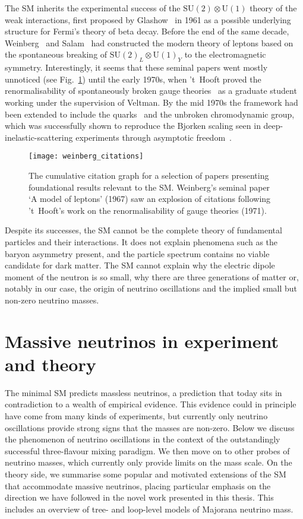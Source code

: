 The SM inherits the experimental success of the
$\mathrm{SU}(2) \otimes \mathrm{U}(1)$ theory of the weak interactions, first
proposed by Glashow~\cite{Glashow:1961tr} in 1961 as a possible underlying
structure for Fermi's theory of beta decay. Before the end of the same decade,
Weinberg~\cite{Weinberg:1967tq} and Salam~\cite{Salam:1968rm} had constructed
the modern theory of leptons based on the spontaneous breaking of
$\mathrm{SU}(2)_{L} \otimes \mathrm{U}(1)_{Y}$ to the electromagnetic symmetry.
Interestingly, it seems that these seminal papers went mostly unnoticed (see
Fig.~\ref{fig:weinberg-citations}) until the early 1970s, when 't~Hooft proved
the renormalisability of spontaneously broken gauge
theories~\cite{tHooft:1971akt} as a graduate student working under the
supervision of Veltman. By the mid 1970s the framework had been extended to
include the quarks~\cite{Glashow:1970gm} and the unbroken chromodynamic group,
which was successfully shown to reproduce the Bjorken scaling seen in
deep-inelastic-scattering experiments through asymptotic
freedom~\cite{Gross:1973id}.
\begin{figure}[t]
  \centering
  \texttt{[image: weinberg\_citations]}
  \caption{The cumulative citation graph for a selection of papers presenting
    foundational results relevant to the SM. Weinberg's seminal paper `A model
    of leptons' (1967) saw an explosion of citations following 't~Hooft's work
    on the renormalisability of gauge theories (1971).}
  \label{fig:weinberg-citations}
\end{figure}

Despite its successes, the SM cannot be the complete theory of fundamental
particles and their interactions. It does not explain phenomena such as the
baryon asymmetry present, and the particle spectrum contains no viable candidate
for dark matter. The SM cannot explain why the electric dipole moment of the
neutron is so small, why there are three generations of matter or, notably in
our case, the origin of neutrino oscillations and the implied small but non-zero
neutrino masses.

\section{Massive neutrinos in experiment and theory}

The minimal SM predicts massless neutrinos, a prediction that today sits in
contradiction to a wealth of empirical evidence. This evidence could in
principle have come from many kinds of experiments, but currently only neutrino
oscillations provide strong signs that the masses are non-zero. Below we discuss
the phenomenon of neutrino oscillations in the context of the outstandingly
successful three-flavour mixing paradigm. We then move on to other probes of
neutrino masses, which currently only provide limits on the mass scale. On the
theory side, we summarise some popular and motivated extensions of the SM that
accommodate massive neutrinos, placing particular emphasis on the direction we
have followed in the novel work presented in this thesis. This includes an
overview of tree- and loop-level models of Majorana neutrino mass.

